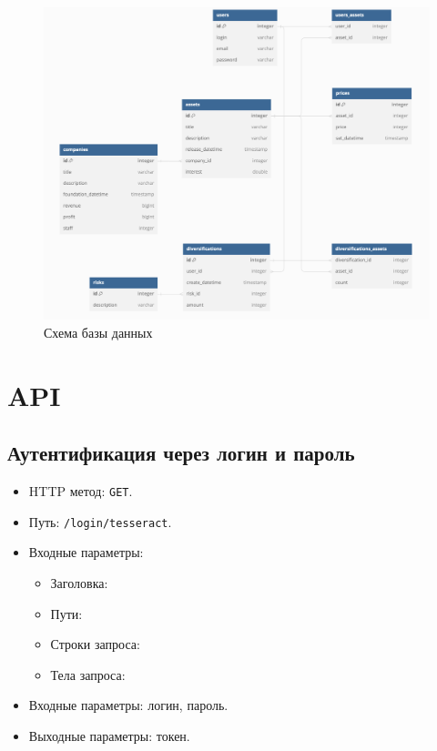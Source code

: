 \documentclass[a4paper, 14pt]{article}
\begin{document}
\begin{figure}[H]
    \centering
    \includegraphics[width=17cm]{resources/14.png}
    \caption{Схема базы данных}
\end{figure}

\section{API}

\subsection{Аутентификация через логин и пароль}

\begin{itemize}
    \item HTTP метод: \texttt{GET}.
    \item Путь: \texttt{/login/tesseract}.
    \item Входные параметры: %
    \begin{itemize}
        \item Заголовка:
        \item Пути:
        \item Строки запроса:
        \item Тела запроса:
    \end{itemize}
    \item Входные параметры: логин, пароль.
    \item Выходные параметры: токен.
\end{itemize}
\end{document}
